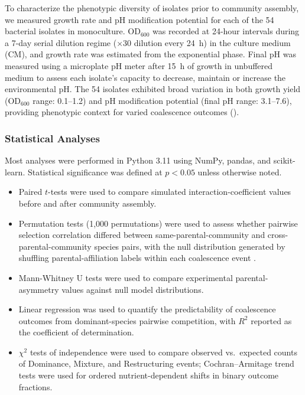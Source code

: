 To characterize the phenotypic diversity of isolates prior to community assembly, we measured growth rate and pH modification potential for each of the 54 bacterial isolates in monoculture. OD$_{600}$ was recorded at 24-hour intervals during a 7-day serial dilution regime ($\times$30 dilution every 24~h) in the culture medium (CM), and growth rate was estimated from the exponential phase. Final pH was measured using a microplate pH meter after 15~h of growth in unbuffered medium to assess each isolate's capacity to decrease, maintain or increase the environmental pH.  The 54 isolates exhibited broad variation in both growth yield (OD$_{600}$ range: 0.1--1.2) and pH modification potential (final pH range: 3.1--7.6), providing phenotypic context for varied coalescence outcomes ().


\subsubsection*{Statistical Analyses}
\label{sec:suppl:statistics}

Most analyses were performed in Python 3.11 using NumPy, pandas, and scikit-learn. Statistical significance was defined at $p < 0.05$ unless otherwise noted. 

\begin{itemize}
    \item Paired $t$-tests were used to compare simulated interaction-coefficient values before and after community assembly.
    \item Permutation tests (1,000 permutations) were used to assess whether pairwise selection correlation differed between same-parental-community and cross-parental-community species pairs, with the null distribution generated by shuffling parental-affiliation labels within each coalescence event .
    \item Mann-Whitney U tests were used to compare experimental parental-asymmetry values against null model distributions.
    \item Linear regression was used to quantify the predictability of coalescence outcomes from dominant-species pairwise competition, with $R^2$ reported as the coefficient of determination.
    \item $\chi^2$ tests of independence were used to compare observed vs.\ expected counts of Dominance, Mixture, and Restructuring events; Cochran--Armitage trend tests were used for ordered nutrient-dependent shifts in binary outcome fractions.
\end{itemize}
